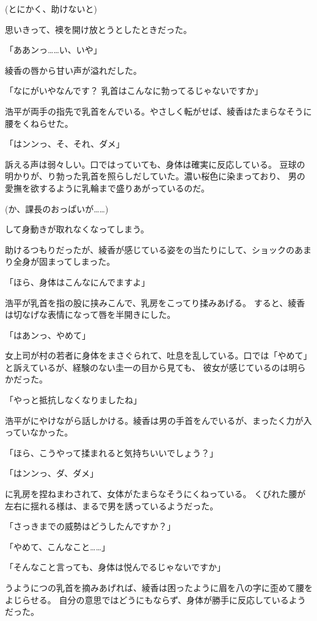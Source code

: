 ﻿\documentclass[
    book,tate,
    line_length=30zw,
    jafontsize=12pt,
    paper=b5j,
    landscape,
    ]{jlreq}
\begin{document}
(とにかく、助けないと)

思いきって、襖を開け放とうとしたときだった。

「ああンっ……い、いや」

綾香の唇から甘い声が溢れだした。

「なにがいやなんです？ 乳首はこんなに勃ってるじゃないですか」

浩平が両手の指先で乳首をんでいる。やさしく転がせば、綾香はたまらなそうに腰をくねらせた。

「はンンっ、そ、それ、ダメ」

訴える声は弱々しい。口ではっていても、身体は確実に反応している。
豆球の明かりが、り勃った乳首を照らしだしていた。濃い桜色に染まっており、
男の愛撫を欲するように乳輪まで盛りあがっているのだ。

(か、課長のおっぱいが……)

して身動きが取れなくなってしまう。

助けるつもりだったが、綾香が感じている姿をの当たりにして、ショックのあまり全身が固まってしまった。

「ほら、身体はこんなにんでますよ」

浩平が乳首を指の股に挟みこんで、乳房をこってり揉みあげる。 すると、綾香は切なげな表情になって唇を半開きにした。

「はあンっ、やめて」

女上司が村の若者に身体をまさぐられて、吐息を乱している。口では「やめて」と訴えているが、経験のない圭一の目から見ても、
彼女が感じているのは明らかだった。

「やっと抵抗しなくなりましたね」

浩平がにやけながら話しかける。綾香は男の手首をんでいるが、まったく力が入っていなかった。

「ほら、こうやって揉まれると気持ちいいでしょう？」

「はンンっ、ダ、ダメ」

に乳房を捏ねまわされて、女体がたまらなそうにくねっている。
くびれた腰が左右に揺れる様は、まるで男を誘っているようだった。

「さっきまでの威勢はどうしたんですか？」

「やめて、こんなこと……」

「そんなこと言っても、身体は悦んでるじゃないですか」

うようにつの乳首を摘みあげれば、綾香は困ったように眉を八の字に歪めて腰をよじらせる。
自分の意思ではどうにもならず、身体が勝手に反応しているようだった。
\end{document}
